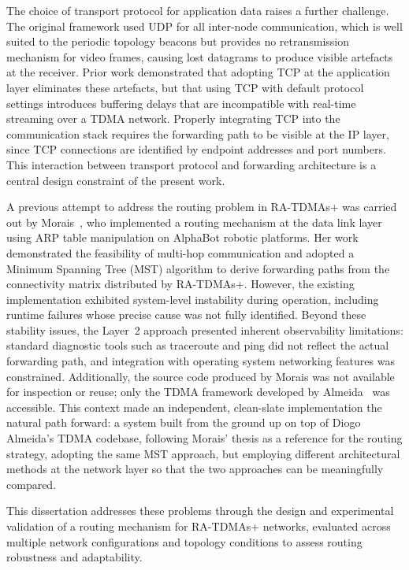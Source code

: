 The choice of transport protocol for application data raises a further
challenge. The original framework used UDP for all inter-node communication,
which is well suited to the periodic topology beacons but provides no
retransmission mechanism for video frames, causing lost datagrams to produce
visible artefacts at the receiver. Prior work demonstrated that adopting TCP at
the application layer eliminates these artefacts, but that using TCP with
default protocol settings introduces buffering delays that are incompatible
with real-time streaming over a TDMA network. Properly integrating TCP into
the communication stack requires the forwarding path to be visible at the IP
layer, since TCP connections are identified by endpoint addresses and port
numbers. This interaction between transport protocol and forwarding
architecture is a central design constraint of the present work.

A previous attempt to address the routing problem in RA-TDMAs+ was carried
out by Morais~\cite{morais2024synchronization}, who implemented a routing
mechanism at the data link layer using ARP table manipulation on AlphaBot
robotic platforms. Her work demonstrated the feasibility of multi-hop
communication and adopted a Minimum Spanning Tree (MST) algorithm to derive
forwarding paths from the connectivity matrix distributed by RA-TDMAs+.
However, the existing implementation exhibited system-level instability
during operation, including runtime failures whose precise cause was not
fully identified. Beyond these stability issues, the Layer~2 approach
presented inherent observability limitations: standard diagnostic tools
such as traceroute and ping did not reflect the actual forwarding path,
and integration with operating system networking features was constrained.
Additionally, the source code produced by Morais was not available for
inspection or reuse; only the TDMA framework developed by
Almeida~\cite{almeida2023synchronization} was accessible. This context
made an independent, clean-slate implementation the natural path forward:
a system built from the ground up on top of Diogo Almeida's TDMA
codebase, following Morais' thesis as a reference for the routing
strategy, adopting the same MST approach, but employing different
architectural methods at the network layer so that the two approaches
can be meaningfully compared.

This dissertation addresses these problems through the design and experimental
validation of a routing mechanism for RA-TDMAs+ networks, evaluated across
multiple network configurations and topology conditions to assess routing
robustness and adaptability.


